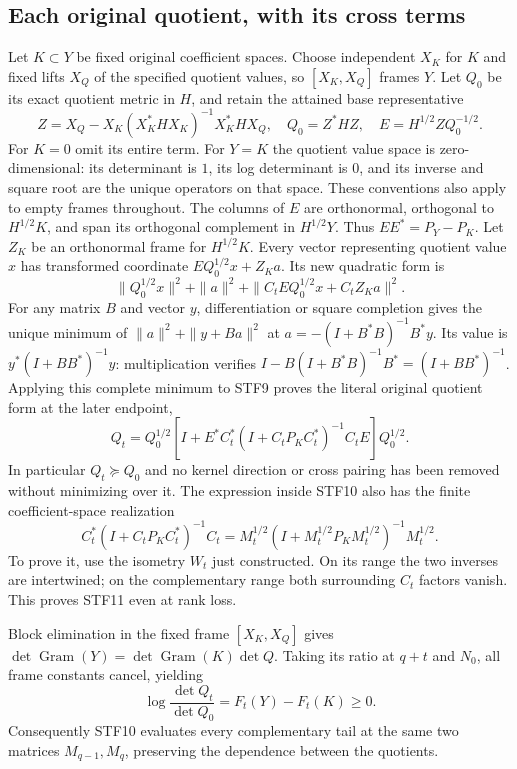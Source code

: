 \documentclass[11pt,a4paper]{article}
\begin{document}
\subsection{Each original quotient, with its cross terms}
Let $K\subset Y$ be fixed original coefficient spaces. Choose independent
$X_K$ for $K$ and fixed lifts $X_Q$ of the specified quotient values, so
$[X_K,X_Q]$ frames $Y$. Let $Q_0$ be its exact quotient metric in $H$,
and retain the attained base representative
\[
 Z=X_Q-X_K(X_K^*HX_K)^{-1}X_K^*HX_Q,\quad
 Q_0=Z^*HZ,\quad E=H^{1/2}ZQ_0^{-1/2}.                   \tag{STF8}
\]
For $K=0$ omit its entire term. For $Y=K$ the quotient value space
is zero-dimensional: its determinant is $1$, its log determinant is $0$,
and its inverse and square root are the unique operators on that space.
These conventions also apply to empty frames throughout.
The columns of $E$ are orthonormal,
orthogonal to $H^{1/2}K$, and span its orthogonal complement in
$H^{1/2}Y$. Thus $EE^*=P_Y-P_K$. Let $Z_K$ be an orthonormal frame
for $H^{1/2}K$. Every vector representing quotient value $x$ has
transformed coordinate $EQ_0^{1/2}x+Z_Ka$. Its new quadratic form is
\[
 \|Q_0^{1/2}x\|^2+\|a\|^2+
       \|C_tEQ_0^{1/2}x+C_tZ_Ka\|^2 .                   \tag{STF9}
\]
For any matrix $B$ and vector $y$, differentiation or square completion
gives the unique minimum of $\|a\|^2+\|y+Ba\|^2$ at
$a=-(I+B^*B)^{-1}B^*y$. Its value is
$y^*(I+BB^*)^{-1}y$: multiplication verifies
$I-B(I+B^*B)^{-1}B^*=(I+BB^*)^{-1}$.
Applying this complete minimum to STF9 proves the literal original
quotient form at the later endpoint,
\[
 Q_t=Q_0^{1/2}\left[I+E^*C_t^*(I+C_tP_KC_t^*)^{-1}C_tE\right]Q_0^{1/2}.
                                                               \tag{STF10}
\]
In particular $Q_t\succeq Q_0$ and no kernel direction or cross pairing
has been removed without minimizing over it. The expression inside
STF10 also has the finite coefficient-space realization
\[
 C_t^*(I+C_tP_KC_t^*)^{-1}C_t
 =M_t^{1/2}(I+M_t^{1/2}P_KM_t^{1/2})^{-1}M_t^{1/2}.       \tag{STF11}
\]
To prove it, use the isometry $W_t$ just constructed. On its range the
two inverses are intertwined; on the complementary range both surrounding
$C_t$ factors vanish. This proves STF11 even at rank loss.

Block elimination in the fixed frame $[X_K,X_Q]$ gives
$\det\operatorname{Gram}(Y)=\det\operatorname{Gram}(K)\det Q$.
Taking its ratio at $q+t$ and $N_0$, all frame constants cancel, yielding
\[
 \log\frac{\det Q_t}{\det Q_0}=F_t(Y)-F_t(K)\ge0.        \tag{STF12}
\]
Consequently STF10 evaluates every complementary tail at the same two
matrices $M_{q-1},M_q$, preserving the dependence between the quotients.
\end{document}
